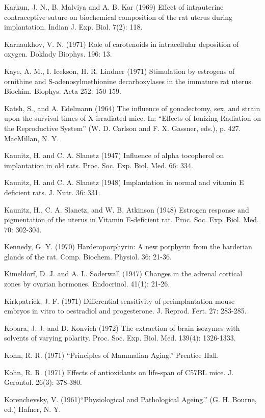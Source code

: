 Karkun, J. N., B. Malviya and A. B. Kar (1969) Effect of intrauterine contraceptive suture on biochemical composition of the rat uterus during implantation. Indian J. Exp. Biol. 7(2): 118.

Karnaukhov, V. N. (1971) Role of carotenoids in intracellular deposition of oxygen. Doklady Biophys. 196: 13.


Kaye, A. M., I. Icekson, H. R. Lindner (1971) Stimulation by estrogens of ornithine and S-adenosylmethionine decarboxylases in the immature rat uterus. Biochim. Biophys. Acta 252: 150-159.

Katsh, S., and A. Edelmann (1964) The influence of gonadectomy, sex, and strain upon the survival times of X-irradiated mice. In: ``Effects of Ionizing Radiation on the Reproductive System'' (W. D. Carlson and F. X. Gassner, eds.), p. 427. MacMillan, N. Y.

Kaunitz, H. and C. A. Slanetz (1947) Influence of alpha tocopherol on implantation in old rats. Proc. Soc. Exp. Biol. Med. 66: 334.

Kaunitz, H. and C. A. Slanetz (1948) Implantation in normal and vitamin E deficient rats. J. Nutr. 36: 331.

Kaunitz, H., C. A. Slanetz, and W. B. Atkinson (1948) Estrogen response and pigmentation of the uterus in Vitamin E-deficient rat. Proc. Soc. Exp. Biol. Med. 70: 302-304.

Kennedy, G. Y. (1970) Harderoporphyrin: A new porphyrin from the harderian glands of the rat. Comp. Biochem. Physiol. 36: 21-36.

Kimeldorf, D. J. and A. L. Soderwall (1947) Changes in the adrenal cortical zones by ovarian hormones. Endocrinol. 41(1): 21-26.

Kirkpatrick, J. F. (1971) Differential sensitivity of preimplantation mouse embryos in vitro to oestradiol and progesterone. J. Reprod. Fert. 27: 283-285.

Kobara, J. J. and D. Konvich (1972) The extraction of brain isozymes with solvents of varying polarity. Proc. Soc. Exp. Biol. Med. 139(4): 1326-1333.

Kohn, R. R. (1971) ``Principles of Mammalian Aging.'' Prentice Hall.

Kohn, R. R. (1971) Effects of antioxidants on life-span of C57BL mice. J. Gerontol. 26(3): 378-380.

Korenchevsky, V. (1961)``Physiological and Pathological Ageing.'' (G. H. Bourne, ed.) Hafner, N. Y.

